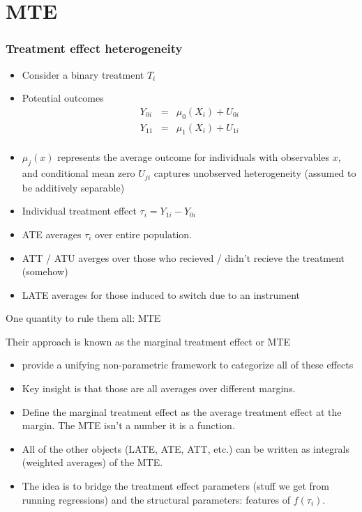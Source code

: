 \section{MTE}

\begin{frame}
  \frametitle{Treatment effect heterogeneity}
  \begin{itemize}
    \item Consider a binary treatment $T_i$
    \item Potential outcomes
      \begin{eqnarray*}
      Y_{0i} &=& \mu_{0}(X_i) + U_{0i} \\
      Y_{11} &=& \mu_{1}(X_i) + U_{1i}\\
      \end{eqnarray*}
    \item $\mu_j(x)$ represents the average outcome for individuals with observables $x$, and conditional mean zero $U_{ji}$ captures unobserved heterogeneity (assumed to be additively separable)
    \item Individual treatment effect $\tau_i = Y_{1i} - Y_{0i}$ 
    \item ATE averages $\tau_i$ over entire population.
    \item ATT / ATU averges over those who recieved / didn't recieve the treatment (somehow)
    \item LATE averages for those induced to switch due to an instrument 
  \end{itemize}
\end{frame}

\begin{frame}{One quantity to rule them all: MTE}

 Their approach is known as the \alert{marginal treatment effect} or MTE
\begin{itemize}
\item \citet{heckman2005structural} provide a unifying non-parametric framework to categorize all of these effects
\item Key insight is that those are all averages over different margins. 
\item Define the \alert{marginal treatment effect} as the average treatment effect at the margin. The MTE isn't a number it is a \alert{function}.
\item All of the other objects (LATE, ATE, ATT, etc.) can be written as integrals (weighted averages) of the MTE.
\item The idea is to bridge the treatment effect parameters (stuff we get from running regressions) and the structural parameters: features of $f(\tau_i)$.
\end{itemize}
\end{frame}

